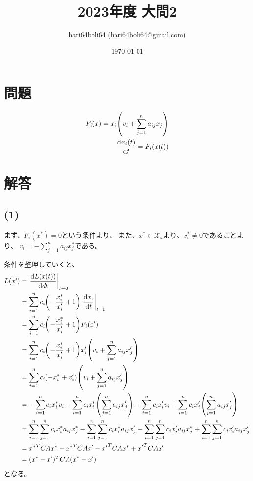 \documentclass[a4paper, 10pt, dvipdfmx]{jlreq}
\begin{document}
\title{2023年度 大問2}
\author{hari64boli64 (hari64boli64@gmail.com)}
\date{\today}
\maketitle

\section{問題}

\begin{align*}
  F_i(x)=x_i \qty(v_i+\sum_{j=1}^{n}a_{ij}x_j) \\
  \dv{x_i(t)}{t}=F_i(x(t))
\end{align*}

\section{解答}

\subsection*{(1)}

まず、$F_i(x^*)=0$という条件より、
また、$x^* \in \mathcal{X}_n$より、$x^*_i \neq 0$であることより、
$v_i=-\sum_{j=1}^{n}{a_{ij}x^*_j}$である。

条件を整理していくと、
\begin{align*}
  \dot{L(x')} & =\left.\dv{L(x(t))}{dt}\right|_{t=0}                                                                \\
              & =\sum_{i=1}^{n}{c_i\qty(-\frac{x_i^*}{x'_i}+1)\left.\dv{x_i}{t}\right|_{t=0}}                       \\
              & =\sum_{i=1}^{n}{c_i\qty(-\frac{x_i^*}{x'_i}+1)F_i(x')}                                              \\
              & =\sum_{i=1}^{n}{c_i\qty(-\frac{x_i^*}{x'_i}+1)x'_i\qty(v_i+\sum_{j=1}^{n}a_{ij}x'_j)}               \\
              & =\sum_{i=1}^{n}{c_i\qty(-x_i^*+x'_i)\qty(v_i+\sum_{j=1}^{n}a_{ij}x'_j)}                             \\
              & =-\sum_{i=1}^{n}{c_ix_i^*v_i}-\sum_{i=1}^{n}{c_ix_i^*\qty(\sum_{j=1}^{n}a_{ij}x'_j)}
  +\sum_{i=1}^{n}{c_ix'_iv_i}+\sum_{i=1}^{n}{c_ix'_i\qty(\sum_{j=1}^{n}a_{ij}x'_j)}                                 \\
              & =\sum_{i=1}^{n}\sum_{j=1}^{n}{c_ix_i^*a_{ij}x^*_j}-\sum_{i=1}^{n}\sum_{j=1}^{n}{c_ix_i^*a_{ij}x'_j}
  -\sum_{i=1}^{n}\sum_{j=1}^{n}{c_ix'_ia_{ij}x^*_j}+\sum_{i=1}^{n}\sum_{j=1}^{n}{c_ix'_ia_{ij}x'_j}                 \\
              & ={x^*}^TCAx^*-{x^*}^TCAx'-{x'}^TCAx^*+{x'}^TCAx'                                                    \\
              & =(x^*-x')^TCA(x^*-x')
\end{align*}
となる。
\end{document}
